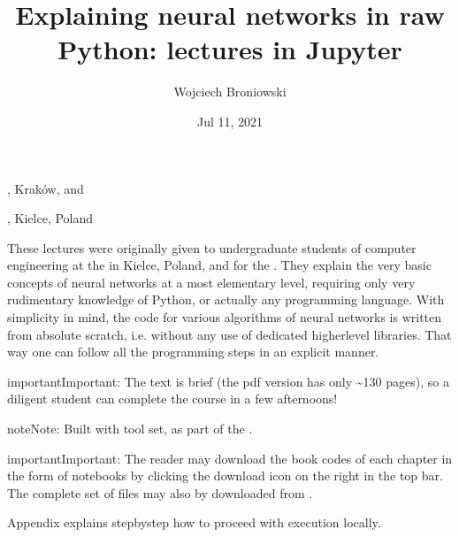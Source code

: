 \documentclass[letterpaper,10pt,english]{jupyterBook}
\title{Explaining neural networks in raw Python: lectures in Jupyter}
\date{Jul 11, 2021}
\author{Wojciech Broniowski}
\begin{document}
\pagestyle{empty}
\sphinxmaketitle
\pagestyle{plain}
\sphinxtableofcontents
\pagestyle{normal}
\label{\detokenize{docs/index::doc}}


\sphinxAtStartPar
{}

\sphinxAtStartPar
{}, Kraków, and

\sphinxAtStartPar
{}, Kielce, Poland

\sphinxAtStartPar
These lectures were originally given to undergraduate students of computer engineering at the  in Kielce, Poland, and for
the . They explain the very basic concepts of neural networks at a most elementary level, requiring only very rudimentary knowledge of Python, or actually any programming language. With simplicity in mind, the code for various algorithms of neural networks is written from absolute scratch, i.e. without any use of dedicated higher\sphinxhyphen{}level libraries. That way one can follow all the programming steps in an explicit manner.

\begin{sphinxadmonition}{important}{Important:}
\sphinxAtStartPar
The text is brief (the pdf version has only \textasciitilde{}130 pages), so a diligent student can complete the course in a few afternoons!
\end{sphinxadmonition}

\begin{sphinxadmonition}{note}{Note:}
\sphinxAtStartPar
Built with  tool set, as part of the
.
\end{sphinxadmonition}

\begin{sphinxadmonition}{important}{Important:}
\sphinxAtStartPar
The reader may download the book codes of each chapter in the form of
 notebooks by clicking the download icon on the right in the top bar. The complete set of files may also by downloaded from .

\sphinxAtStartPar
Appendix {\hyperref[\detokenize{docs/appendix:app-run}]{}} explains step\sphinxhyphen{}by\sphinxhyphen{}step how to proceed with execution locally.
\end{sphinxadmonition}
\end{document}
